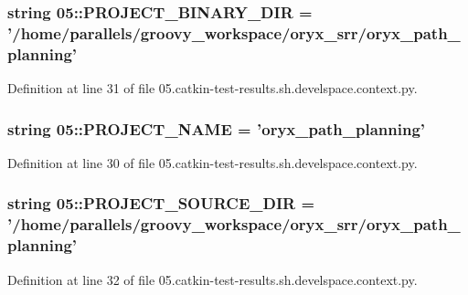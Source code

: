 \subsubsection[{\-P\-R\-O\-J\-E\-C\-T\-\_\-\-B\-I\-N\-A\-R\-Y\-\_\-\-D\-I\-R}]{\setlength{\rightskip}{0pt plus 5cm}string 05\-::{\bf \-P\-R\-O\-J\-E\-C\-T\-\_\-\-B\-I\-N\-A\-R\-Y\-\_\-\-D\-I\-R} = '/home/parallels/groovy\-\_\-workspace/oryx\-\_\-srr/oryx\-\_\-path\-\_\-planning'}\label{namespace05_a7993dd17a228b0235dc59716a466be4b}


\-Definition at line 31 of file 05.\-catkin-\/test-\/results.\-sh.\-develspace.\-context.\-py.

\subsubsection[{\-P\-R\-O\-J\-E\-C\-T\-\_\-\-N\-A\-M\-E}]{\setlength{\rightskip}{0pt plus 5cm}string 05\-::{\bf \-P\-R\-O\-J\-E\-C\-T\-\_\-\-N\-A\-M\-E} = 'oryx\-\_\-path\-\_\-planning'}\label{namespace05_aaf8a7610bb62706914b392bcd3bf878a}


\-Definition at line 30 of file 05.\-catkin-\/test-\/results.\-sh.\-develspace.\-context.\-py.

\subsubsection[{\-P\-R\-O\-J\-E\-C\-T\-\_\-\-S\-O\-U\-R\-C\-E\-\_\-\-D\-I\-R}]{\setlength{\rightskip}{0pt plus 5cm}string 05\-::{\bf \-P\-R\-O\-J\-E\-C\-T\-\_\-\-S\-O\-U\-R\-C\-E\-\_\-\-D\-I\-R} = '/home/parallels/groovy\-\_\-workspace/oryx\-\_\-srr/oryx\-\_\-path\-\_\-planning'}\label{namespace05_a0f7587cda21ed62df9ad962f7e4c202a}


\-Definition at line 32 of file 05.\-catkin-\/test-\/results.\-sh.\-develspace.\-context.\-py.

